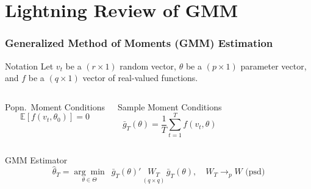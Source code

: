 \section{Lightning Review of GMM}
\begin{frame}
  \frametitle{Generalized Method of Moments (GMM) Estimation}

  \begin{block}{Notation}
  Let $v_t$ be a $(r\times 1)$ random vector, $\theta$ be a $(p\times 1)$ parameter vector, and $f$ be a $(q\times 1)$ vector of real-valued functions.
\end{block}

  \begin{columns}
    \begin{block}{Popn.\ Moment Conditions}
      \vspace{-1em}
      \[
        \mathbb{E}\left[ f(v_t, \theta_0) \right] = 0
      \]
    \end{block}

    \begin{block}{Sample Moment Conditions}
      \vspace{-1em}
      \[
        \bar{g}_T(\theta) = \frac{1}{T}\sum_{t=1}^T f(v_t, \theta)
      \]
    \end{block}
  \end{columns}

  \begin{block}{GMM Estimator}
    \vspace{-1em}
    \[
      \widehat{\theta}_T = \underset{\theta \in \Theta}{\arg \min} \,\,\, \bar{g}_T(\theta)' \, \underset{(q\times q)}{W_T} \, \bar{g}_T(\theta), \quad W_T \rightarrow_p W \mbox{ (psd)}
    \]
  \end{block}

\end{frame}

